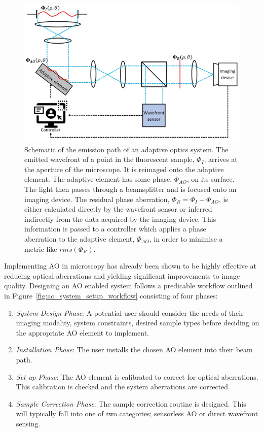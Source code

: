 \begin{figure}[h]
	\centering
	\includegraphics[width=\textwidth]{images/ao_system_schematic_simple.jpg}
	\caption[Schematic of the emission path of an adaptive optics
	system.]{Schematic of the emission path of an adaptive
		optics system. The emitted wavefront of a point in the
		fluorescent sample, $\Phi_{I}$, arrives at the aperture of
		the microscope. It is reimaged onto the adaptive
		element. The adaptive element has some phase, $\Phi_{AO}$,
		on its surface. The light then passes through a beamsplitter
		and is focused onto an imaging device. The residual phase
		aberration, $\Phi_{R} = \Phi_{I} - \Phi_{AO}$, is either
		calculated directly by the wavefront sensor or inferred
		indirectly from the data acquired by the imaging
		device. This information is passed to a controller which
		applies a phase aberration to the adaptive element,
		$\Phi_{AO}$, in order to minimise a metric like $rms(\Phi_{R})$.}
	\label{fig:ao_system_schematic_simple}
\end{figure}

Implementing AO in microscopy has already been shown to be highly 
effective at reducing optical aberrations and yielding significant 
improvements to image 
quality\cite{booth2014adaptive,girkin2009adaptive,fraisier2015adaptive,jesacher2011sensorless,
	jian2014wavefront}. Designing an AO enabled system follows a predicable 
workflow outlined in Figure~\ref{fig:ao_system_setup_workflow} 
consisting of four phases:

\begin{enumerate}
	\item \textit{System Design Phase}: A potential user should consider 
	the needs of their imaging modality, system constraints, desired 
	sample types before deciding on the appropriate AO element to 
	implement.
	\item \textit{Installation Phase}: The user installs the chosen AO 
	element into their beam path.
	\item \textit{Set-up Phase}: The AO element is calibrated to correct 
	for optical aberrations. This calibration is checked and the system 
	aberrations are corrected.
	\item \textit{Sample Correction Phase}: The sample correction routine 
	is designed. This will typically fall into one of two categories; 
	sensorless AO or direct wavefront sensing.
\end{enumerate}  

